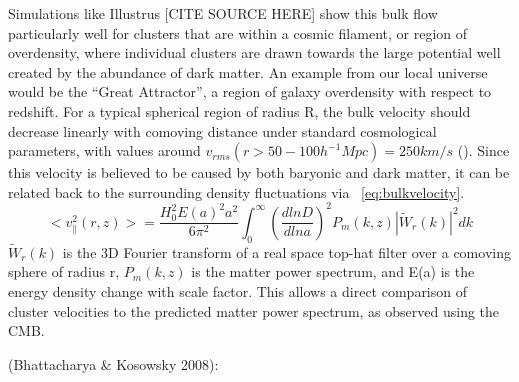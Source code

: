\documentclass[manuscript]{aastex}
\begin{document}
Simulations like Illustrus [CITE SOURCE HERE] show this bulk flow particularly well for clusters that are within a cosmic filament, or region of overdensity, where individual clusters are drawn towards the large potential well created by the abundance of dark matter. An example from our local universe would be the ``Great Attractor'', a region of galaxy overdensity with respect to redshift. For a typical spherical region of radius R, the bulk velocity should decrease linearly with comoving distance under standard cosmological parameters, with values around \(v_{rms}(r > 50-100  h^{-1} Mpc) = 250 km/s\) (\cite{Mak2011}). Since this velocity is believed to be caused by both baryonic and dark matter, it can be related back to the surrounding density fluctuations via ~\ref{eq:bulkvelocity}. 
\begin{equation}\label{eq:bulkvelocity}
 <v^{2}_{\parallel}(r,z)> = \frac{H_{0}^{2}E(a)^{2}a^{2}}{6\pi^{2}} \int_{0}^{\infty} (\frac{d ln D}{d ln a})^{2} P_{m}(k,z)|\tilde{W}_{r}(k)|^{2} dk
 \end{equation}
\(\tilde{W}_{r}(k)\) is the 3D Fourier transform of a real space top-hat filter over a comoving sphere of radius r, \(P_{m}(k,z)\) is the matter power spectrum, and E(a) is the energy density change with scale factor. This allows a direct comparison of cluster velocities to the predicted matter power spectrum, as observed using the CMB.

(Bhattacharya \& Kosowsky 2008):



\end{document}

